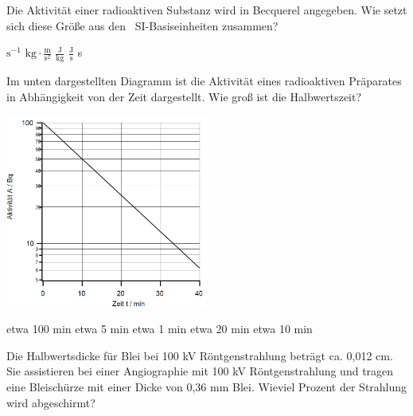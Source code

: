 \documentclass[11pt]{exam}
\begin{document}
\setlength{\voffset}{-0.5in}
\setlength{\headsep}{5pt}

\hspace{2mm}
 \hspace{5mm}
\vspace{4mm}

\begin{questions}

\question Die Aktivität einer radioaktiven Substanz wird in Becquerel angegeben. Wie setzt sich diese Größe aus den  SI-Basiseinheiten zusammen?

\begin{choices}
	\choice \( \text{s}^{-1} \)
	\choice \( \text{kg}\cdot\frac{\text{m}}{\text{s}^2} \)
	\choice \( \frac{\text{J}}{\text{kg}} \)
	\choice \( \frac{\text{J}}{\text{s}} \)
	\choice s
\end{choices}

\vspace{3mm}\question Im unten dargestellten Diagramm ist die Aktivität eines radioaktiven Präparates in Abhängigkeit von der Zeit dargestellt. Wie groß ist die Halbwertszeit? 

\includegraphics[width=0.5\textwidth]{../../../questions/K/images/zerfallsgesetz.png}

\begin{choices}
	\choice etwa 100 min
	\choice etwa 5 min
	\choice etwa 1 min
	\choice etwa 20 min
	\choice etwa 10 min
\end{choices}

\vspace{3mm}\question Die Halbwertsdicke für Blei bei 100 kV Röntgenstrahlung beträgt ca. 0,012 cm. Sie assistieren bei einer Angiographie mit 100 kV Röntgenstrahlung und tragen eine Bleischürze mit einer Dicke von 0,36 mm Blei. Wieviel Prozent der Strahlung wird abgeschirmt?


\end{questions}
\end{document}
